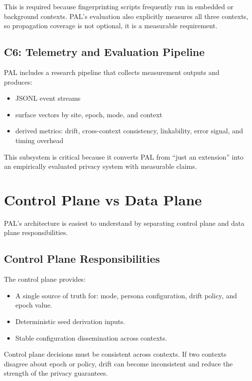 \documentclass[11pt]{report}
\begin{document}
This is required because fingerprinting scripts frequently run in embedded or background contexts. PAL’s evaluation also explicitly measures all three contexts, so propagation coverage is not optional, it is a measurable requirement.

\subsection{C6: Telemetry and Evaluation Pipeline}

PAL includes a research pipeline that collects measurement outputs and produces:
\begin{itemize}
    \item JSONL event streams
    \item surface vectors by site, epoch, mode, and context
    \item derived metrics: drift, cross-context consistency, linkability, error signal, and timing overhead
\end{itemize}

This subsystem is critical because it converts PAL from ``just an extension'' into an empirically evaluated privacy system with measurable claims.

\section{Control Plane vs Data Plane}

PAL’s architecture is easiest to understand by separating control plane and data plane responsibilities.

\subsection{Control Plane Responsibilities}

The control plane provides:
\begin{itemize}
    \item A single source of truth for: mode, persona configuration, drift policy, and epoch value.
    \item Deterministic seed derivation inputs.
    \item Stable configuration dissemination across contexts.
\end{itemize}

Control plane decisions must be consistent across contexts. If two contexts disagree about epoch or policy, drift can become inconsistent and reduce the strength of the privacy guarantees.
\end{document}
